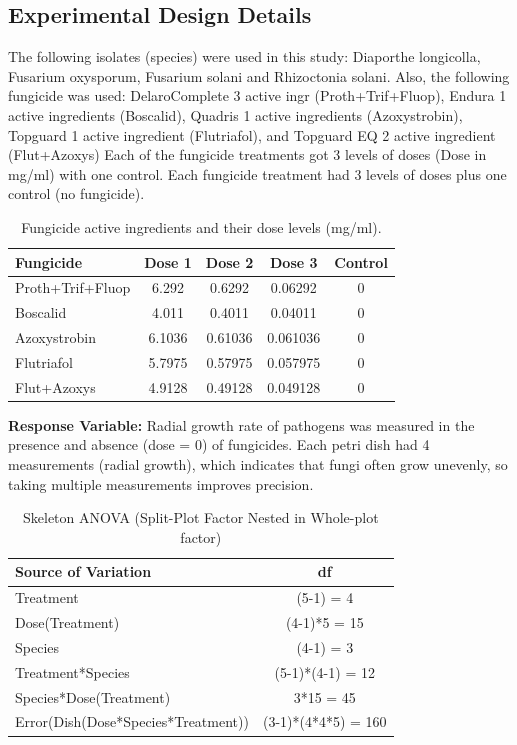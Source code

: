 \documentclass[
  10pt,
  letterpaper,
  twocolumn]{article}
\begin{document}
\hypertarget{experimental-design-details}{%
\subsection{Experimental Design
Details}\label{experimental-design-details}}

\vspace{-1em}

The following isolates (species) were used in this study: Diaporthe
longicolla, Fusarium oxysporum, Fusarium solani and Rhizoctonia solani.
Also, the following fungicide was used: DelaroComplete 3 active ingr
(Proth+Trif+Fluop), Endura 1 active ingredients (Boscalid), Quadris 1
active ingredients (Azoxystrobin), Topguard 1 active ingredient
(Flutriafol), and Topguard EQ 2 active ingredient (Flut+Azoxys) Each of
the fungicide treatments got 3 levels of doses (Dose in mg/ml) with one
control. Each fungicide treatment had 3 levels of doses plus one control
(no fungicide).

\begin{table}[h!]
\scriptsize
\centering
\caption{Fungicide active ingredients and their dose levels (mg/ml).}
\begin{tabular}{|l|c|c|c|c|}
\hline
\textbf{Fungicide} & \textbf{Dose 1} & \textbf{Dose 2} & \textbf{Dose 3} & \textbf{Control} \\
\hline
Proth+Trif+Fluop & 6.292 & 0.6292 & 0.06292 & 0 \\
Boscalid & 4.011 & 0.4011 & 0.04011 & 0 \\
Azoxystrobin & 6.1036 & 0.61036 & 0.061036 & 0 \\
Flutriafol & 5.7975 & 0.57975 & 0.057975 & 0 \\
Flut+Azoxys & 4.9128 & 0.49128 & 0.049128 & 0 \\
\hline
\end{tabular}
\end{table}

\textbf{Response Variable:} Radial growth rate of pathogens was measured
in the presence and absence (dose = 0) of fungicides. Each petri dish
had 4 measurements (radial growth), which indicates that fungi often
grow unevenly, so taking multiple measurements improves precision.

\begin{table}[h!]
\scriptsize
\centering
\caption{Skeleton ANOVA (Split-Plot Factor Nested in Whole-plot factor)}
\begin{tabular}{|l|c|}
\hline
\textbf{Source of Variation} & \textbf{df} \\
\hline
Treatment & (5-1) = 4 \\
\hline
Dose(Treatment) & (4-1)*5 = 15 \\
\hline
Species & (4-1) = 3 \\
\hline
Treatment*Species & (5-1)*(4-1) = 12 \\
\hline
Species*Dose(Treatment) & 3*15 = 45 \\
\hline
Error(Dish(Dose*Species*Treatment)) & (3-1)*(4*4*5) = 160 \\
\hline
\end{tabular}
\end{table}
\end{document}
